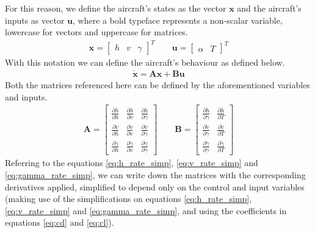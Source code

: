 \documentclass[english,palatino]{ist-report}
\begin{document}
For this reason, we define the aircraft's states as the vector $\mathbf{x}$ and the aircraft's inputs as vector $\mathbf{u}$, where a bold typeface represents a non-scalar variable, lowercase for vectors and uppercase for matrices.
\begin{gather*}
	\mathbf{x} = \left[\begin{matrix}h & v & \gamma\end{matrix}\right]^T \qquad \mathbf{u} = \left[\begin{matrix}\alpha & T\end{matrix}\right]^T
\end{gather*}
With this notation we can define the aircraft's behaviour as defined below.
\begin{gather*}
	\dot{\mathbf{x}} = \mathbf{A}\mathbf{x} + \mathbf{B}\mathbf{u}
\end{gather*}
Both the matrices referenced here can be defined by the aforementioned variables and inputs.
\begin{gather*}
	\mathbf{A} = \left[\begin{matrix}
			\frac{\partial\dot{h}}{\partial h}		& \frac{\partial\dot{h}}{\partial v}		& \frac{\partial\dot{h}}{\partial \gamma} \\
			\frac{\partial\dot{v}}{\partial h}		& \frac{\partial\dot{v}}{\partial v}		& \frac{\partial\dot{v}}{\partial \gamma} \\
			\frac{\partial\dot{\gamma}}{\partial h}	& \frac{\partial\dot{\gamma}}{\partial v}	& \frac{\partial\dot{\gamma}}{\partial \gamma}
		\end{matrix}\right]
		\qquad \mathbf{B} = \left[\begin{matrix}
			\frac{\partial\dot{h}}{\partial \gamma}			& \frac{\partial\dot{h}}{\partial T}		\\
			\frac{\partial\dot{v}}{\partial \gamma}			& \frac{\partial\dot{v}}{\partial T}		\\
			\frac{\partial\dot{\gamma}}{\partial \gamma}	& \frac{\partial\dot{\gamma}}{\partial T}
		\end{matrix}\right]
\end{gather*}
Referring to the equations \ref{eq:h_rate_simp}, \ref{eq:v_rate_simp} and \ref{eq:gamma_rate_simp}, we can write down the matrices with the corresponding derivatives applied, simplified to depend only on the control and input variables (making use of the simplifications on equations \ref{eq:h_rate_simp}, \ref{eq:v_rate_simp} and \ref{eq:gamma_rate_simp}, and using the coefficients in equations \ref{eq:cd} and \ref{eq:cl}).
\end{document}

